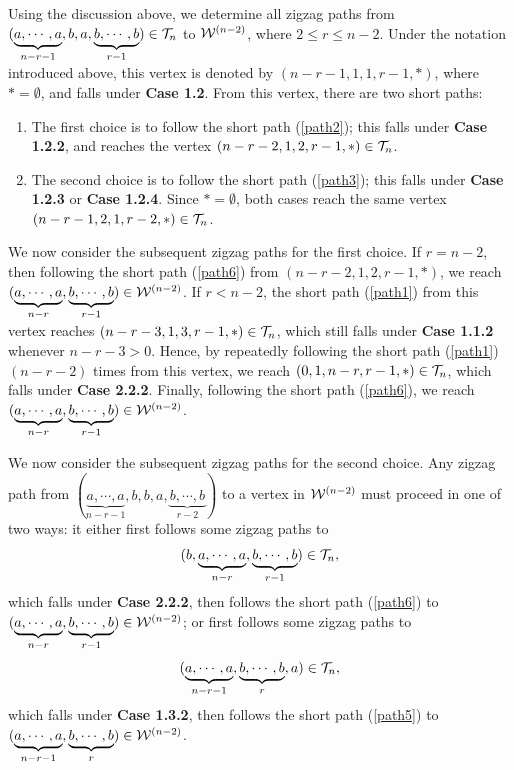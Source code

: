 \documentclass[10pt, reqno]{amsart}
\theoremstyle{definition}
\theoremstyle{remark}
\numberwithin{equation}{section}
\begin{document}
Using the discussion above, we determine all zigzag paths from \((\underbrace{a, \cdots,a}_{n-r-1}, b, a, \underbrace{b, \cdots,b}_{r-1}) \in \mathcal{T}_n\) to \(\mathcal{W}^{(n-2)}\), where \(2 \le r \le n-2\). Under the notation introduced above, this vertex is denoted by \((n-r-1, 1, 1, r-1, *)\), where \(*=\emptyset\), and falls under \textbf{Case 1.2}. From this vertex, there are two short paths:
\begin{enumerate}
    \item The first choice is to follow the short path (\ref{path2}); this falls under \textbf{Case 1.2.2}, and reaches the vertex \((n-r-2, 1, 2, r-1, *)\in \mathcal{T}_n\).
    \item The second choice is to  follow the short path (\ref{path3}); this falls under \textbf{Case 1.2.3} or \textbf{Case 1.2.4}. Since \(*=\emptyset\), both cases reach the same vertex \((n-r-1, 2, 1, r-2, *)\in \mathcal{T}_n\).
\end{enumerate}

We now consider the subsequent zigzag paths for the first choice. If \(r=n-2\), then following the short path (\ref{path6}) from \((n-r-2, 1, 2, r-1, *)\), we reach \((\underbrace{a, \cdots,a}_{n-r}, \underbrace{b, \cdots,b}_{r-1})\in \mathcal{W}^{(n-2)}\). 
If \(r<n-2\), the short path (\ref{path1}) from this vertex reaches \((n-r-3, 1, 3, r-1,*) \in \mathcal{T}_n\), which still falls under \textbf{Case 1.1.2} whenever  \(n-r-3 >0\). Hence, by repeatedly following the short path  (\ref{path1}) \((n-r-2)\) times from this vertex, we reach \((0,1, n-r, r-1,*)\in \mathcal{T}_n\), which falls under \textbf{Case 2.2.2}. Finally, following the short path (\ref{path6}), we reach \((\underbrace{a, \cdots,a}_{n-r}, \underbrace{b, \cdots,b}_{r-1})\in \mathcal{W}^{(n-2)}\).

We now consider the subsequent zigzag paths for the second choice. Any zigzag path from \((\underbrace{a, \cdots,a}_{n-r-1}, b, b, a, \underbrace{b, \cdots,b}_{r-2})\) to a vertex in \(\mathcal{W}^{(n-2)}\) must proceed in one of two ways: it either first follows some zigzag paths to  
\[(b, \underbrace{a, \cdots,a}_{n-r}, \underbrace{b, \cdots,b}_{r-1})\in \mathcal{T}_n,\]
which falls under \textbf{Case 2.2.2}, then follows the short path (\ref{path6}) to \((\underbrace{a, \cdots,a}_{n-r}, \underbrace{b, \cdots,b}_{r-1})\in \mathcal{W}^{(n-2)}\); 
or first follows some zigzag paths to  
\[(\underbrace{a, \cdots,a}_{n-r-1}, \underbrace{b, \cdots,b}_{r}, a)\in \mathcal{T}_n,\] 
which falls under \textbf{Case 1.3.2}, then follows the short path (\ref{path5}) to \((\underbrace{a, \cdots,a}_{n-r-1}, \underbrace{b, \cdots,b}_{r})\in \mathcal{W}^{(n-2)}\).
\end{document}

